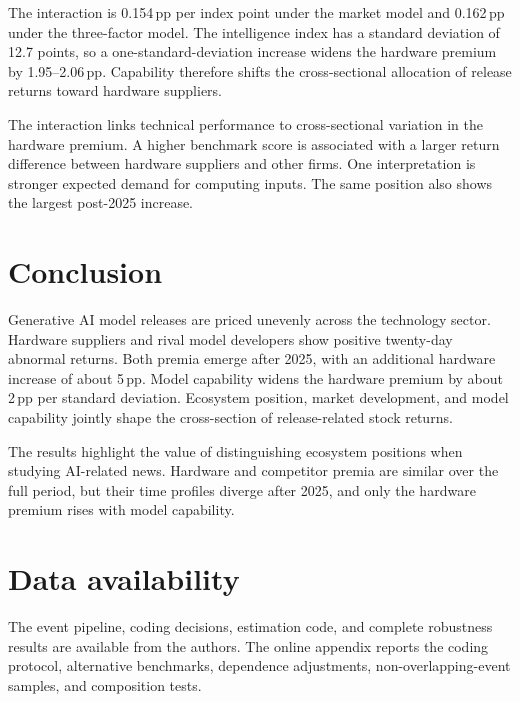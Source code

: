 \documentclass[review,12pt,authoryear]{elsarticle}
\newcommand{\pp}{\,pp}
\begin{document}
The interaction is 0.154\pp{} per index point under the market model and
0.162\pp{} under the three-factor model. The intelligence index has a
standard deviation of 12.7 points, so a one-standard-deviation increase
widens the hardware premium by 1.95--2.06\pp{}. Capability therefore shifts
the cross-sectional allocation of release returns toward hardware suppliers.

The interaction links technical performance to cross-sectional variation
in the hardware premium. A higher benchmark score is associated with a
larger return difference between hardware suppliers and other firms. One
interpretation is stronger expected demand for computing inputs. The same
position also shows the largest post-2025 increase.

\section{Conclusion}\label{sec:conclusion}

Generative AI model releases are priced unevenly across the technology
sector. Hardware suppliers and rival model developers show positive
twenty-day abnormal returns. Both premia emerge after 2025, with an additional
hardware increase of about 5\pp{}. Model capability widens the hardware
premium by about 2\pp{} per standard deviation. Ecosystem position, market
development, and model capability jointly shape the cross-section of
release-related stock returns.

The results highlight the value of distinguishing ecosystem positions when
studying AI-related news. Hardware and competitor premia are similar over
the full period, but their time profiles diverge after 2025, and only the
hardware premium rises with model capability.

\section*{Data availability}

The event pipeline, coding decisions, estimation code, and complete
robustness results are available from the authors. The online appendix
reports the coding protocol, alternative benchmarks, dependence
adjustments, non-overlapping-event samples, and composition tests.
\end{document}
